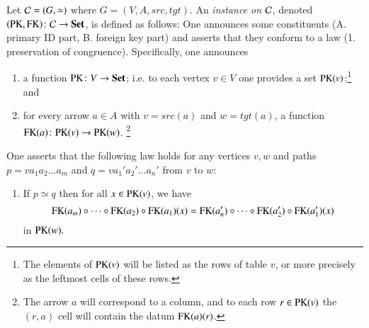 \begin{definition}\label{def:instance}

Let $\mathcal{C}=(G,\simeq)$ where $G=(V,A,src,tgt)$. An {\em instance on $\mathcal{C}$}, denoted $(\PK,\FK)\taking\mcC\to\Set$, is defined as follows: One announces some constituents (A. primary ID part, B. foreign key part) and asserts that they conform to a law (1. preservation of congruence). Specifically, one announces
\begin{enumerate}[\hsp A.]
\item a function $\PK\taking V\to \Set$; i.e. to each vertex $v\in V$ one provides a set $\PK(v)$;\footnote{The elements of $\PK(v)$ will be listed as the rows of table $v$, or more precisely as the leftmost cells of these rows.} and
\item for every arrow $a\in A$ with $v=src(a)$ and $w=tgt(a)$, a function $\FK(a)\taking\PK(v)\to\PK(w)$.
\footnote{The arrow $a$ will correspond to a column, and to each row $r\in\PK(v)$ the $(r,a)$ cell will contain the datum $\FK(a)(r)$.}
\end{enumerate}
One asserts that the following law holds for any vertices $v, w$ and paths $p=va_1a_2\ldots a_m$ and $q=va_1'a_2'\ldots a_n'$ from $v$ to $w$:
\begin{enumerate}[\hsp 1.]
\item If $p\simeq q$ then for all $x\in\PK(v)$, we have $$\FK(a_m)\circ\cdots\circ\FK(a_2)\circ\FK(a_1)(x)=\FK(a_n')\circ\cdots\circ\FK(a_2')\circ\FK(a_1')(x)$$ in $\PK(w).$
\end{enumerate}

\end{definition}


